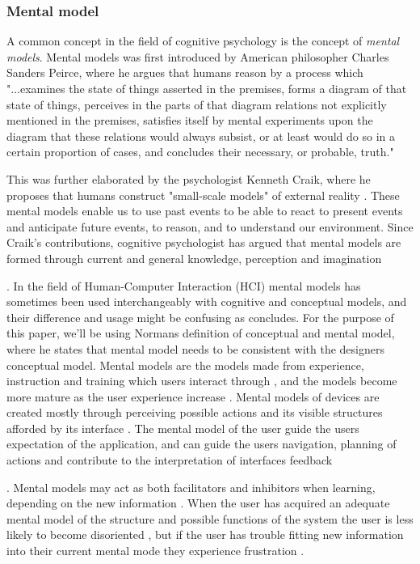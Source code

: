 \subsubsection{Mental model}
A common concept in the field of cognitive psychology is the concept of \textit{mental models}. Mental models was first introduced by American philosopher Charles Sanders Peirce, where he argues that humans reason by a process which
"...examines the state of things
asserted in the premises, forms a diagram of that state of things, perceives in the parts of that diagram relations not explicitly mentioned in the premises, satisfies itself by mental experiments upon the diagram that these relations would always subsist, or at least would do so in a certain proportion of cases, and concludes their necessary, or probable, truth." \cite{Pierce1974}

This was further elaborated by the psychologist Kenneth Craik, where he proposes that humans construct "small-scale models" of external reality \cite{Craik1967}. These mental models enable us to use past events to be able to react to present events and anticipate future events, to reason, and to understand our environment. Since Craik's contributions, cognitive psychologist has argued that mental models are formed through current and general knowledge, perception and imagination \cite{Johnson-Laird2001} . In the field of Human-Computer Interaction (HCI) mental models has sometimes been used interchangeably with cognitive and conceptual models, and their difference and usage might be confusing as \cite{Staggers1993} concludes. For the purpose of this paper, we'll be using Normans \cite{Norman2013a} definition of conceptual and mental model, where he states that mental model needs to be consistent with the designers conceptual model. Mental models are the models made from experience, instruction and training which users interact through \cite{Norman2013a}, and the models become more mature as the user experience increase \cite{Barker1998}. Mental models of devices are created mostly through perceiving possible actions and its visible structures afforded by its interface \cite{Norman2013a}. The mental model of the user guide the users expectation of the application, and can guide the users navigation, planning of actions and contribute to the interpretation of interfaces feedback \cite{Jin1992}. Mental models may act as both facilitators and inhibitors when learning, depending on the new information \cite{Cho1996}. When the user has acquired an adequate mental model of the structure and possible functions of the system the user is less likely to become disoriented \cite{Jih1992}, but if the user has trouble fitting new information into their current mental mode they experience frustration \cite{DApollonia2004}.


